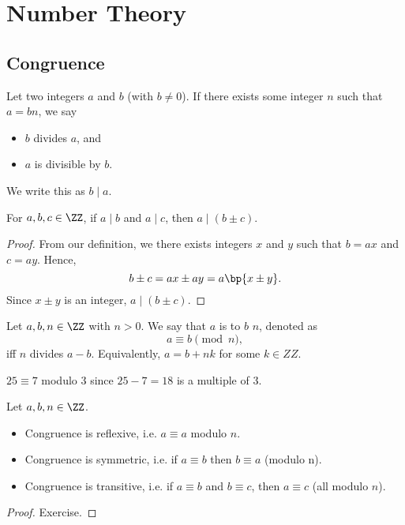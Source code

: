 \chapter{Number Theory}

\section{Congruence}

\begin{definition}
    Let two integers $a$ and $b$ (with $b \neq 0$). If there exists some integer $n$ such that $a = bn$, we say
    \begin{itemize}
        \item $b$ divides $a$, and
        \item $a$ is divisible by $b$.
    \end{itemize}
    We write this as $b \mid a$.
\end{definition}

\begin{proposition}
    For $a, b, c \in \ZZ$, if $a \mid b$ and $a \mid c$, then $a \mid (b \pm c)$.
\end{proposition}
\begin{proof}
    From our definition, we there exists integers $x$ and $y$ such that $b = ax$ and $c = ay$. Hence, \[b \pm c = ax \pm ay = a\bp{x \pm y}.\] Since $x \pm y$ is an integer, $a \mid (b \pm c)$.
\end{proof}

\begin{definition}
    Let $a, b, n \in \ZZ$ with $n > 0$. We say that $a$ is  to $b$  $n$, denoted as \[a \equiv b \pmod{n},\] iff $n$ divides $a - b$. Equivalently, $a = b + nk$ for some $k \in ZZ$.
\end{definition}

\begin{example}
    $25 \equiv 7$ modulo 3 since $25 - 7 = 18$ is a multiple of 3.
\end{example}

\begin{proposition}
    Let $a, b, n \in \ZZ$.
    \begin{itemize}
        \item Congruence is reflexive, i.e. $a \equiv a$ modulo $n$.
        \item Congruence is symmetric, i.e. if $a \equiv b$ then $b \equiv a$ (modulo n).
        \item Congruence is transitive, i.e. if $a \equiv b$ and $b \equiv c$, then $a \equiv c$ (all modulo $n$).
    \end{itemize}
\end{proposition}
\begin{proof}
    Exercise.
\end{proof}

